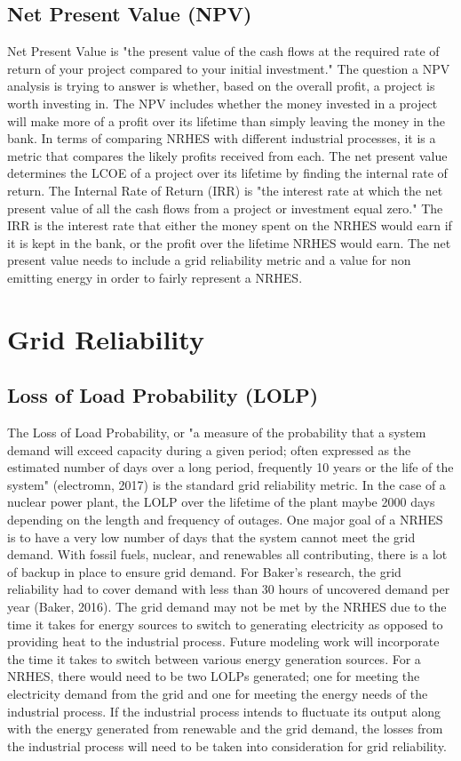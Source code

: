 \documentclass[12pt]{UIdahoMastersThesis}
\begin{document}
\subsection{Net Present Value (NPV)}
Net Present Value is "the present value of the cash flows at the required rate of return of your project compared to your initial investment." The question a NPV analysis is trying to answer is whether, based on the overall profit, a project is worth investing in.  The NPV includes whether the money invested in a project will make more of a profit over its lifetime than simply leaving the money in the bank.  In terms of comparing NRHES with different industrial processes, it is a metric that compares the likely profits received from each.  The net present value determines the LCOE of a project over its lifetime by finding the internal rate of return.  The Internal Rate of Return (IRR) is "the interest rate at which the net present value of all the cash flows from a project or investment equal zero."  The IRR is the interest rate that either the money spent on the NRHES would earn if it is kept in the bank, or the profit over the lifetime NRHES would earn.  The net present value needs to include a grid reliability metric and a value for non emitting energy in order to fairly represent a NRHES. 

\section{Grid Reliability}
\subsection{Loss of Load Probability (LOLP)}
The Loss of Load Probability, or "a measure of the probability that a system demand will exceed capacity during a given period; often expressed as the estimated number of days over a long period, frequently 10 years or the life of the system" (electromn, 2017) is the standard grid reliability metric.  In the case of a nuclear power plant, the LOLP over the lifetime of the plant maybe 2000 days depending on the length and frequency of outages. One major goal of a NRHES is to have a very low number of days that the system cannot meet the grid demand.  With fossil fuels, nuclear, and renewables all contributing, there is a lot of backup in place to ensure grid demand. For Baker's research, the grid reliability had to cover demand with less than 30 hours of uncovered demand per year (Baker, 2016).  The grid demand may not be met by the NRHES due to the time it takes for energy sources to switch to generating electricity as opposed to providing heat to the industrial process. Future modeling work will incorporate the time it takes to switch between various energy generation sources.
For a NRHES, there would need to be two LOLPs generated; one for meeting the electricity demand from the grid and one for meeting the energy needs of the industrial process.  If the industrial process intends to fluctuate its output along with the energy generated from renewable and the grid demand, the losses from the industrial process will need to be taken into consideration for grid reliability. 
\end{document}
